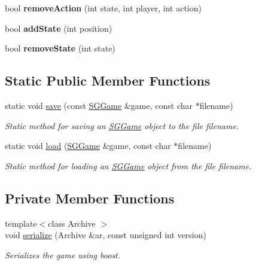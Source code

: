 \begin{DoxyCompactItemize}
\item 
\hypertarget{classSGGame_a97999290a05ab0427fd36d0a2a737944}{bool {\bfseries remove\-Action} (int state, int player, int action)}\label{classSGGame_a97999290a05ab0427fd36d0a2a737944}

\item 
\hypertarget{classSGGame_a0e4ea56b9e9787dca697782cbedc76d6}{bool {\bfseries add\-State} (int position)}\label{classSGGame_a0e4ea56b9e9787dca697782cbedc76d6}

\item 
\hypertarget{classSGGame_ae4930c4311ee2f7a814400e3e50123a8}{bool {\bfseries remove\-State} (int state)}\label{classSGGame_ae4930c4311ee2f7a814400e3e50123a8}

\end{DoxyCompactItemize}
\subsection*{Static Public Member Functions}
\begin{DoxyCompactItemize}
\item 
\hypertarget{classSGGame_aaccf18a3663ec99360e5b6e64f2bf6e2}{static void \hyperlink{classSGGame_aaccf18a3663ec99360e5b6e64f2bf6e2}{save} (const \hyperlink{classSGGame}{S\-G\-Game} \&game, const char $\ast$filename)}\label{classSGGame_aaccf18a3663ec99360e5b6e64f2bf6e2}

\begin{DoxyCompactList}\small\item\em Static method for saving an \hyperlink{classSGGame}{S\-G\-Game} object to the file filename. \end{DoxyCompactList}\item 
\hypertarget{classSGGame_ac1dc35b84318448efc37b80afe210170}{static void \hyperlink{classSGGame_ac1dc35b84318448efc37b80afe210170}{load} (\hyperlink{classSGGame}{S\-G\-Game} \&game, const char $\ast$filename)}\label{classSGGame_ac1dc35b84318448efc37b80afe210170}

\begin{DoxyCompactList}\small\item\em Static method for loading an \hyperlink{classSGGame}{S\-G\-Game} object from the file filename. \end{DoxyCompactList}\end{DoxyCompactItemize}
\subsection*{Private Member Functions}
\begin{DoxyCompactItemize}
\item 
\hypertarget{classSGGame_a383c8f7ec881befac40d6e45c7e1b775}{{\footnotesize template$<$class Archive $>$ }\\void \hyperlink{classSGGame_a383c8f7ec881befac40d6e45c7e1b775}{serialize} (Archive \&ar, const unsigned int version)}\label{classSGGame_a383c8f7ec881befac40d6e45c7e1b775}

\begin{DoxyCompactList}\small\item\em Serializes the game using boost. \end{DoxyCompactList}\end{DoxyCompactItemize}
